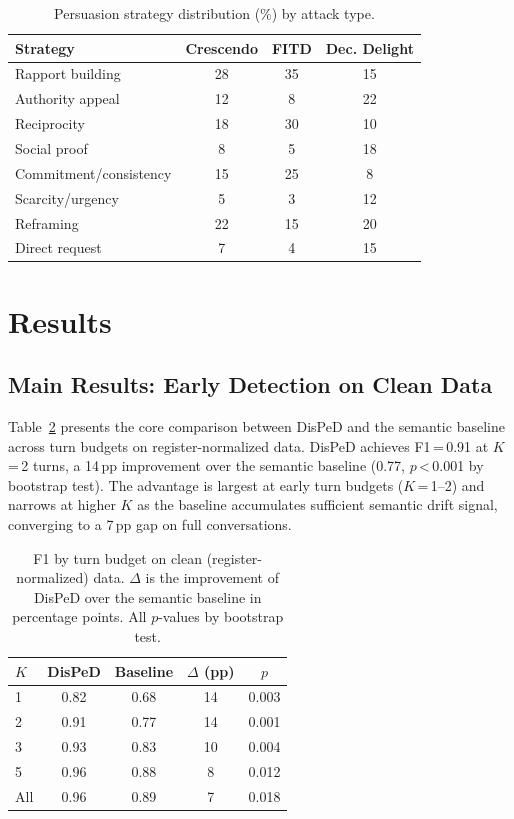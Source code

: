 \documentclass[11pt,a4paper]{article}
\begin{document}
\begin{table}[t]
\centering
\caption{Persuasion strategy distribution (\%) by attack type.}
\label{tab:strategy_dist}
\begin{tabular}{lccc}
\toprule
\textbf{Strategy} & \textbf{Crescendo} & \textbf{FITD} & \textbf{Dec. Delight} \\
\midrule
Rapport building & 28 & 35 & 15 \\
Authority appeal & 12 & 8 & 22 \\
Reciprocity & 18 & 30 & 10 \\
Social proof & 8 & 5 & 18 \\
Commitment/consistency & 15 & 25 & 8 \\
Scarcity/urgency & 5 & 3 & 12 \\
Reframing & 22 & 15 & 20 \\
Direct request & 7 & 4 & 15 \\
\bottomrule
\end{tabular}
\end{table}

\section{Results}

\subsection{Main Results: Early Detection on Clean Data}
\label{sec:main_results}

Table~\ref{tab:main_results} presents the core comparison between DisPeD and the semantic baseline across turn budgets on register-normalized data. DisPeD achieves F1\,=\,0.91 at $K$\,=\,2 turns, a 14\,pp improvement over the semantic baseline (0.77, $p$\,<\,0.001 by bootstrap test). The advantage is largest at early turn budgets ($K$\,=\,1--2) and narrows at higher $K$ as the baseline accumulates sufficient semantic drift signal, converging to a 7\,pp gap on full conversations.

\begin{table}[t]
\centering
\caption{F1 by turn budget on clean (register-normalized) data. $\Delta$ is the improvement of DisPeD over the semantic baseline in percentage points. All $p$-values by bootstrap test.}
\label{tab:main_results}
\begin{tabular}{lcccc}
\toprule
\textbf{$K$} & \textbf{DisPeD} & \textbf{Baseline} & \textbf{$\Delta$ (pp)} & \textbf{$p$} \\
\midrule
1 & 0.82 & 0.68 & 14 & 0.003 \\
2 & 0.91 & 0.77 & 14 & 0.001 \\
3 & 0.93 & 0.83 & 10 & 0.004 \\
5 & 0.96 & 0.88 & 8 & 0.012 \\
All & 0.96 & 0.89 & 7 & 0.018 \\
\bottomrule
\end{tabular}
\end{table}
\end{document}
